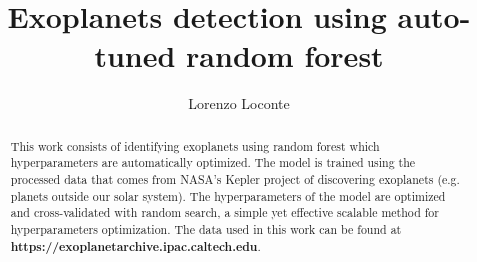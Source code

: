 \documentclass[11pt, a4paper]{article}
\title{Exoplanets detection using auto-tuned random forest}
\author{Lorenzo Loconte}
\begin{document}
\maketitle
\begin{abstract}
  This work consists of identifying exoplanets using random forest which hyperparameters are automatically optimized.
  The model is trained using the processed data that comes from NASA's Kepler project of discovering exoplanets (e.g. planets outside our solar system).
  The hyperparameters of the model are optimized and cross-validated with random search, a simple yet effective scalable method for hyperparameters optimization.
  The data used in this work can be found at \textbf{https://exoplanetarchive.ipac.caltech.edu}.
\end{abstract}
\vspace{5mm}
\end{document}
